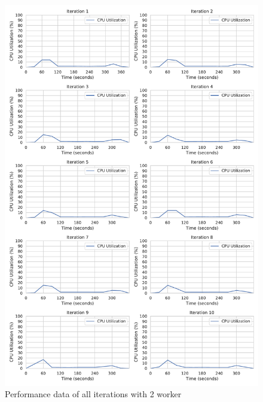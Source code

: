 \begin{figure}[h]
\centering
\includegraphics[scale=0.4]{images/07_evaluation/regression/2_worker_cpu_performance}
\caption{Performance data of all iterations with 2 worker}
\label{fig:appendix_eval_regression_static2}
\end{figure}

